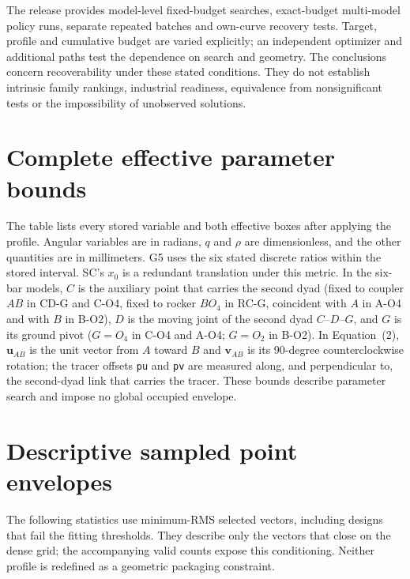 \documentclass[applsci,article,submit,pdftex,moreauthors]{Definitions/mdpi}
\begin{document}
The release provides \VTwoRuns{} model-level fixed-budget searches, \VTwoQDRuns{} exact-budget multi-model policy runs, separate repeated batches and own-curve recovery tests. Target, profile and cumulative budget are varied explicitly; an independent optimizer and additional paths test the dependence on search and geometry. The conclusions concern recoverability under these stated conditions. They do not establish intrinsic family rankings, industrial readiness, equivalence from nonsignificant tests or the impossibility of unobserved solutions.

\appendixstart
\appendix
\section{Complete effective parameter bounds}\label{app:bounds}
The table lists every stored variable and both effective boxes after applying the profile. Angular variables are in radians, $q$ and $\rho$ are dimensionless, and the other quantities are in millimeters. G5 uses the six stated discrete ratios within the stored interval. SC's $x_0$ is a redundant translation under this metric. In the six-bar models, $C$ is the auxiliary point that carries the second dyad (fixed to coupler $AB$ in CD-G and C-O4, fixed to rocker $BO_4$ in RC-G, coincident with $A$ in A-O4 and with $B$ in B-O2), $D$ is the moving joint of the second dyad $C$--$D$--$G$, and $G$ is its ground pivot ($G=O_4$ in C-O4 and A-O4; $G=O_2$ in B-O2). In Equation~(2), $\mathbf u_{AB}$ is the unit vector from $A$ toward $B$ and $\mathbf v_{AB}$ is its 90-degree counterclockwise rotation; the tracer offsets \texttt{pu} and \texttt{pv} are measured along, and perpendicular to, the second-dyad link that carries the tracer. These bounds describe parameter search and impose no global occupied envelope.

\section{Descriptive sampled point envelopes}\label{app:envelopes}
The following statistics use minimum-RMS selected vectors, including designs that fail the fitting thresholds. They describe only the vectors that close on the dense grid; the accompanying valid counts expose this conditioning. Neither profile is redefined as a geometric packaging constraint.

\end{document}
